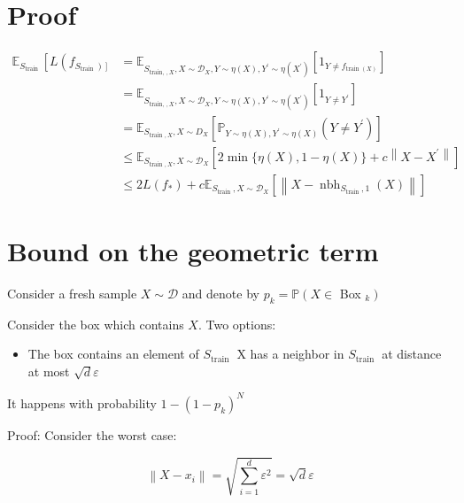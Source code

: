 \documentclass[10pt]{article}
\begin{document}
\section*{Proof}
$$
\begin{aligned}
\mathbb{E}_{S_{\text {train }}}\left[L \left(f_{\left.\left.S_{\text {train }}\right)\right]}\right.\right. & =\mathbb{E}_{S_{\text {train, }, X}, X \sim \mathscr{D}_{X}, Y \sim \eta(X), Y^{\prime} \sim \eta\left(X^{\prime}\right)}\left[1_{Y \neq f_{\text {train }(X)}}\right] \\
& =\mathbb{E}_{S_{\text {train, }, X}, X \sim \mathscr{D}_{X}, Y \sim \eta(X), Y^{\prime} \sim \eta\left(X^{\prime}\right)}\left[1_{Y \neq Y^{\prime}}\right] \\
& =\mathbb{E}_{S_{\text {train }, X}, X \sim D_{X}}\left[\mathbb{P}_{Y \sim \eta(X), Y^{\prime} \sim \eta(X)}\left(Y \neq Y^{\prime}\right)\right] \\
& \leq \mathbb{E}_{S_{\text {train }, X}, X \sim \mathscr{D}_{X}}\left[2 \min \{\eta(X), 1-\eta(X)\}+c\left\|X-X^{\prime}\right\|\right] \\
& \leq 2 L\left(f_{*}\right)+c \mathbb{E}_{S_{\text {train }}, X \sim \mathscr{D}_{X}}\left[\left\|X-\operatorname{nbh}_{S_{\text {train }}, 1}(X)\right\|\right]
\end{aligned}
$$

\section*{Bound on the geometric term}
Consider a fresh sample $X \sim \mathscr{D}$ and denote by $p_{k}=\mathbb{P}\left(X \in\right.$ Box $\left._{k}\right)$

Consider the box which contains $X$. Two options:

\begin{itemize}
  \item The box contains an element of $S_{\text {train }}$ X has a neighbor in $S_{\text {train }}$ at distance at most $\sqrt{d} \varepsilon$
\end{itemize}

It happens with probability $1-\left(1-p_{k}\right)^{N}$

Proof: Consider the worst case:

$$
\left\|X-x_{i}\right\|=\sqrt{\sum_{i=1}^{d} \varepsilon^{2}}=\sqrt{d} \varepsilon
$$
\end{document}
